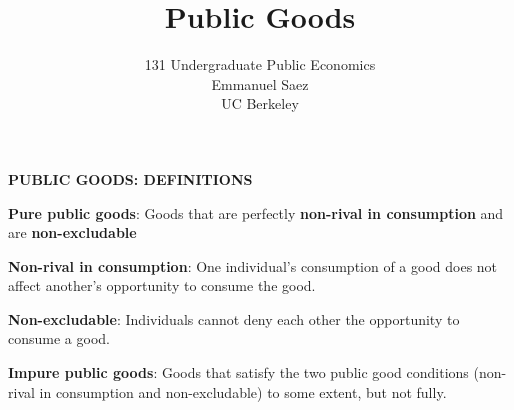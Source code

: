 \documentclass[landscape]{slides}
\author{131 Undergraduate Public Economics \\ Emmanuel Saez \\ UC Berkeley}
\date{}
\title{Public Goods} \onlyslides{1-300}
\begin{document}
\begin{slide}
\maketitle
\end{slide}

%
%
%
%
%
%
%



\begin{slide}
\begin{center}
{\bf PUBLIC GOODS: DEFINITIONS}
\end{center}

{\bf Pure public goods}:
Goods that are perfectly \textbf{non-rival in consumption} and are \textbf{non-excludable}

{\bf Non-rival in consumption}:
One individual's consumption of a good does not affect another's opportunity to consume the good.

{\bf Non-excludable}:
Individuals cannot deny each other the opportunity to consume a good.

{\bf Impure public goods}:
Goods that satisfy the two public good conditions (non-rival in consumption and non-excludable) to some extent, but not fully.
\end{slide}

\begin{slide}

\end{slide}

%
%
\end{document}
